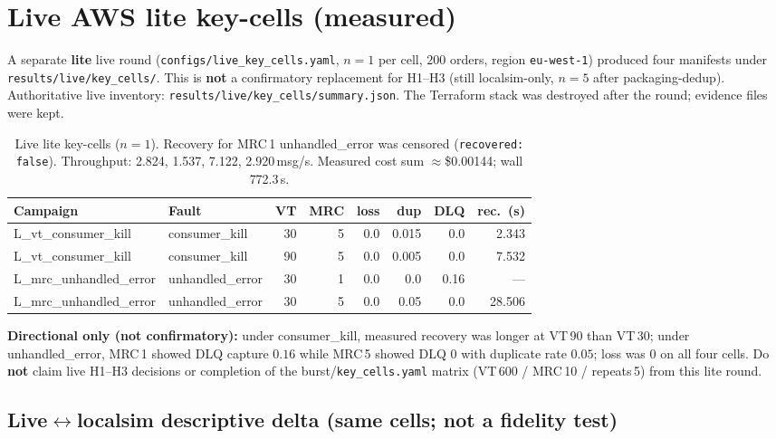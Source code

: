 \section{Live AWS lite key-cells (measured)}

A separate \textbf{lite} live round (\texttt{configs/live\_key\_cells.yaml}, $n=1$ per cell, $200$ orders, region \texttt{eu-west-1}) produced four manifests under \texttt{results/live/key\_cells/}. This is \textbf{not} a confirmatory replacement for H1--H3 (still localsim-only, $n=5$ after packaging-dedup). Authoritative live inventory: \texttt{results/live/key\_cells/summary.json}. The Terraform stack was destroyed after the round; evidence files were kept.

\begin{table}[h]
\centering
\begin{tabular}{llrrrrrr}
\hline
\textbf{Campaign} & \textbf{Fault} & \textbf{VT} & \textbf{MRC} & \textbf{loss} & \textbf{dup} & \textbf{DLQ} & \textbf{rec.\ (s)} \\
\hline
L\_vt\_consumer\_kill & consumer\_kill & 30 & 5 & 0.0 & 0.015 & 0.0 & 2.343 \\
L\_vt\_consumer\_kill & consumer\_kill & 90 & 5 & 0.0 & 0.005 & 0.0 & 7.532 \\
L\_mrc\_unhandled\_error & unhandled\_error & 30 & 1 & 0.0 & 0.0 & 0.16 & --- \\
L\_mrc\_unhandled\_error & unhandled\_error & 30 & 5 & 0.0 & 0.05 & 0.0 & 28.506 \\
\hline
\end{tabular}
\caption{Live lite key-cells ($n=1$). Recovery for MRC\,1 unhandled\_error was censored (\texttt{recovered: false}). Throughput: 2.824, 1.537, 7.122, 2.920\,msg/s. Measured cost sum $\approx$\$0.00144; wall 772.3\,s.}
\end{table}

\textbf{Directional only (not confirmatory):} under consumer\_kill, measured recovery was longer at VT\,90 than VT\,30; under unhandled\_error, MRC\,1 showed DLQ capture $0.16$ while MRC\,5 showed DLQ $0$ with duplicate rate $0.05$; loss was $0$ on all four cells. Do \textbf{not} claim live H1--H3 decisions or completion of the burst/\texttt{key\_cells.yaml} matrix (VT\,600 / MRC\,10 / repeats\,5) from this lite round.

\subsection{Live$\leftrightarrow$localsim descriptive delta (same cells; not a fidelity test)}

